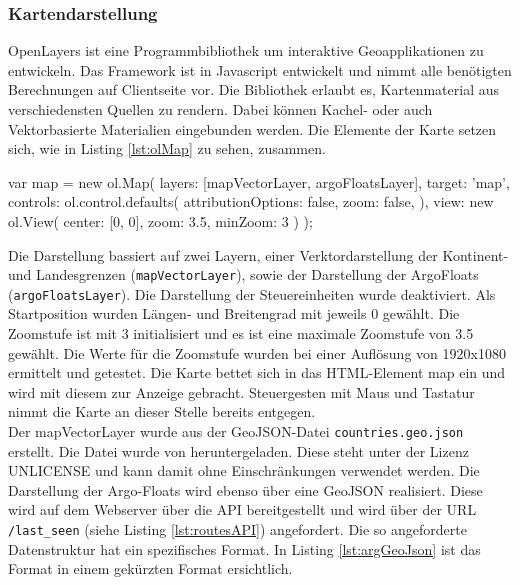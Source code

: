 \subsubsection{Kartendarstellung}

 OpenLayers ist eine Programmbibliothek um interaktive Geoapplikationen zu entwickeln. Das Framework ist in Javascript entwickelt und nimmt alle benötigten Berechnungen auf Clientseite vor. Die Bibliothek erlaubt es, Kartenmaterial aus verschiedensten Quellen zu rendern. Dabei können Kachel- oder auch Vektorbasierte Materialien eingebunden werden.
Die Elemente der Karte setzen sich, wie in Listing \ref{lst:olMap} zu sehen, zusammen.

\begin{javascript}[label={lst:olMap}, caption={Das ol.Map Element aus der Kartendarstellung}]
 var map = new ol.Map({
    layers: [mapVectorLayer, argoFloatsLayer],
    target: 'map',
    controls: ol.control.defaults({
        attributionOptions: false,
        zoom: false,
    }),
    view: new ol.View({
        center: [0, 0],
        zoom: 3.5,
        minZoom: 3
    })
});
\end{javascript}

Die Darstellung bassiert auf zwei Layern, einer Verktordarstellung der Kontinent- und Landesgrenzen (\texttt{mapVectorLayer}), sowie der Darstellung der ArgoFloats (\texttt{argoFloatsLayer}). Die Darstellung der Steuereinheiten wurde deaktiviert. Als Startposition wurden Längen- und Breitengrad mit jeweils 0 gewählt. Die Zoomstufe ist mit 3 initialisiert und es ist eine maximale Zoomstufe von 3.5 gewählt. Die Werte für die Zoomstufe wurden bei einer Auflösung von 1920x1080 ermittelt und getestet.
Die Karte bettet sich in das HTML-Element map ein und wird mit diesem zur Anzeige gebracht. Steuergesten mit Maus und Tastatur nimmt die Karte an dieser Stelle bereits entgegen.
\\
Der mapVectorLayer wurde aus der GeoJSON-Datei \texttt{countries.geo.json}  erstellt. Die Datei wurde von \cite{sundstrm16} heruntergeladen. Diese steht unter der Lizenz UNLICENSE und kann damit ohne Einschränkungen verwendet werden. Die Darstellung der Argo-Floats wird ebenso über eine GeoJSON realisiert. Diese wird auf dem Webserver über die API bereitgestellt und wird über der URL \texttt{/last\_seen}  (siehe Listing \ref{lst:routesAPI}) angefordert. Die so angeforderte Datenstruktur hat ein spezifisches Format. In Listing \ref{lst:argGeoJson} ist das Format in einem gekürzten Format ersichtlich.

